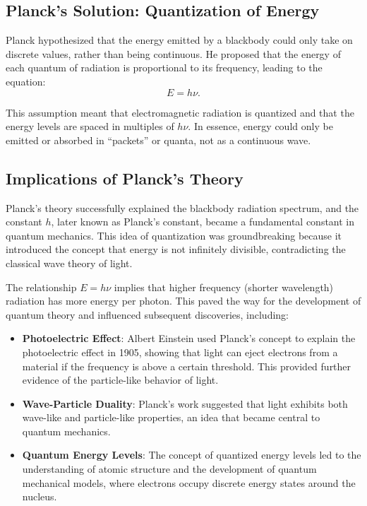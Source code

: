\documentclass{report}
\begin{document}
\subsection{Planck's Solution: Quantization of Energy}

Planck hypothesized that the energy emitted by a blackbody could only take on discrete values, rather than being continuous. He proposed that the energy of each quantum of radiation is proportional to its frequency, leading to the equation:
\[
	E = h \nu.
\]

This assumption meant that electromagnetic radiation is quantized and that the energy levels are spaced in multiples of $h \nu$. In essence, energy could only be emitted or absorbed in “packets” or quanta, not as a continuous wave.

\subsection{Implications of Planck's Theory}

Planck’s theory successfully explained the blackbody radiation spectrum, and the constant $h$, later known as Planck's constant, became a fundamental constant in quantum mechanics. This idea of quantization was groundbreaking because it introduced the concept that energy is not infinitely divisible, contradicting the classical wave theory of light.

The relationship $E = h \nu$ implies that higher frequency (shorter wavelength) radiation has more energy per photon. This paved the way for the development of quantum theory and influenced subsequent discoveries, including:
\begin{itemize}
	\item \textbf{Photoelectric Effect}: Albert Einstein used Planck’s concept to explain the photoelectric effect in 1905, showing that light can eject electrons from a material if the frequency is above a certain threshold. This provided further evidence of the particle-like behavior of light.
	\item \textbf{Wave-Particle Duality}: Planck’s work suggested that light exhibits both wave-like and particle-like properties, an idea that became central to quantum mechanics.
	\item \textbf{Quantum Energy Levels}: The concept of quantized energy levels led to the understanding of atomic structure and the development of quantum mechanical models, where electrons occupy discrete energy states around the nucleus.
\end{itemize}
\end{document}
